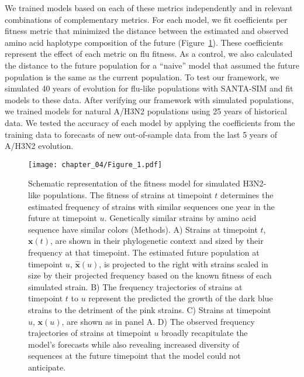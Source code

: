 We trained models based on each of these metrics independently and in relevant combinations of complementary metrics.
For each model, we fit coefficients per fitness metric that minimized the distance between the estimated and observed amino acid haplotype composition of the future (Figure~\ref{fig:model}).
These coefficients represent the effect of each metric on flu fitness.
As a control, we also calculated the distance to the future population for a ``naive'' model that assumed the future population is the same as the current population.
To test our framework, we simulated 40 years of evolution for flu-like populations with SANTA-SIM and fit models to these data.
After verifying our framework with simulated populations, we trained models for natural A/H3N2 populations using 25 years of historical data.
We tested the accuracy of each model by applying the coefficients from the training data to forecasts of new out-of-sample data from the last 5 years of A/H3N2 evolution.

\begin{figure}
  \begin{center}
  \texttt{[image: chapter\_04/Figure\_1.pdf]}
  \caption{
    Schematic representation of the fitness model for simulated H3N2-like populations.
    The fitness of strains at timepoint $t$ determines the estimated frequency of strains with similar sequences one year in the future at timepoint $u$.
    Genetically similar strains by amino acid sequence have similar colors (Methods).
    A) Strains at timepoint $t$, $\mathbf{x}(t)$, are shown in their phylogenetic context and sized by their frequency at that timepoint.
    The estimated future population at timepoint $u$, $\mathbf{\hat{x}}(u)$, is projected to the right with strains scaled in size by their projected frequency based on the known fitness of each simulated strain.
    B) The frequency trajectories of strains at timepoint $t$ to $u$ represent the predicted the growth of the dark blue strains to the detriment of the pink strains.
    C) Strains at timepoint $u$, $\mathbf{x}(u)$, are shown as in panel A.
    D) The observed frequency trajectories of strains at timepoint $u$ broadly recapitulate the model's forecasts while also revealing increased diversity of sequences at the future timepoint that the model could not anticipate.
  }
  \label{fig:model}
  \end{center}
\end{figure}

